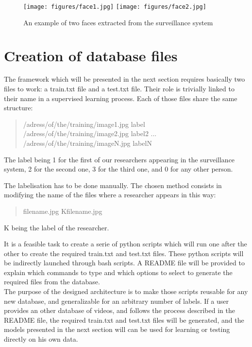 \begin{figure}[t]
  \centering
  \texttt{[image: figures/face1.jpg]}
  \texttt{[image: figures/face2.jpg]}
  \caption[An example of two faces extracted from the surveillance system]{An example of two faces extracted from the surveillance system}
  \label{fig:face}
\end{figure}

\section{Creation of database files}

The framework which will be presented in the next section requires basically two files to work: a train.txt file and a test.txt file. Their role is trivially linked to their name in a supervised learning process. Each of those files share the same structure:

\blockquote{/adress/of/the/training/image1.jpg label\newline
/adress/of/the/training/image2.jpg label2\newline
...\newline
/adress/of/the/training/imageN.jpg labelN}

The label being 1 for the first of our researchers appearing in the surveillance system, 2 for the second one, 3 for the third one, and 0 for any other person.

The labelisation has to be done manually. The chosen method consists in modifying the name of the files where a researcher appears in this way:

\blockquote{filename.jpg \rightarrow Kfilename.jpg
}

K being the label of the researcher.

It is a feasible task to create a serie of python scripts which will run one after the other to create the required train.txt and test.txt files. These python scripts will be indirectly launched through bash scripts. A README file will be provided to explain which commands to type and which options to select to generate the required files from the database.\\

The purpose of the designed architecture is to make those scripts reusable for any new database, and generalizable for an arbitrary number of labels. If a user provides an other database of videos, and follows the process described in the README file, the required train.txt and test.txt files will be generated, and the models presented in the next section will can be used for learning or testing directly on his own data.

